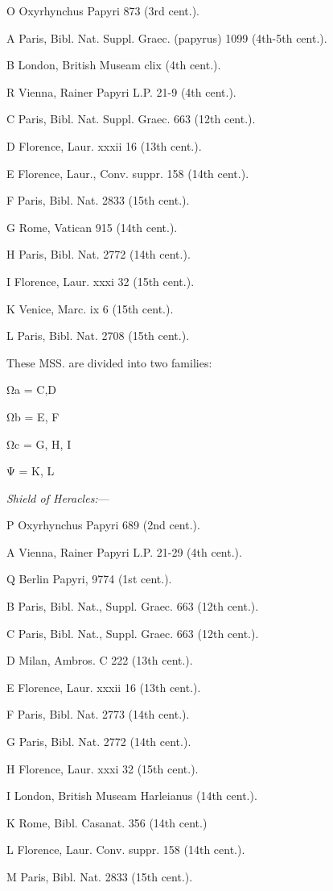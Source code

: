 O Oxyrhynchus Papyri 873 (3rd cent.).

A Paris, Bibl. Nat. Suppl. Graec. (papyrus) 1099 (4th-5th cent.).

B London, British Museam clix (4th cent.).

R Vienna, Rainer Papyri L.P. 21-9 (4th cent.).

C Paris, Bibl. Nat. Suppl. Graec. 663 (12th cent.).

D Florence, Laur. xxxii 16 (13th cent.).

E Florence, Laur., Conv. suppr. 158 (14th cent.).

F Paris, Bibl. Nat. 2833 (15th cent.).

G Rome, Vatican 915 (14th cent.).

H Paris, Bibl. Nat. 2772 (14th cent.).

I Florence, Laur. xxxi 32 (15th cent.).

K Venice, Marc. ix 6 (15th cent.).

L Paris, Bibl. Nat. 2708 (15th cent.).

These MSS. are divided into two families:

Ωa = C,D

Ωb = E, F

Ωc = G, H, I

Ψ = K, L

\emph{Shield of Heracles:}—

P Oxyrhynchus Papyri 689 (2nd cent.).

A Vienna, Rainer Papyri L.P. 21-29 (4th cent.).

Q Berlin Papyri, 9774 (1st cent.).

B Paris, Bibl. Nat., Suppl. Graec. 663 (12th cent.).

C Paris, Bibl. Nat., Suppl. Graec. 663 (12th cent.).

D Milan, Ambros. C 222 (13th cent.).

E Florence, Laur. xxxii 16 (13th cent.).

F Paris, Bibl. Nat. 2773 (14th cent.).

G Paris, Bibl. Nat. 2772 (14th cent.).

H Florence, Laur. xxxi 32 (15th cent.).

I London, British Museam Harleianus (14th cent.).

K Rome, Bibl. Casanat. 356 (14th cent.)

L Florence, Laur. Conv. suppr. 158 (14th cent.).

M Paris, Bibl. Nat. 2833 (15th cent.).

